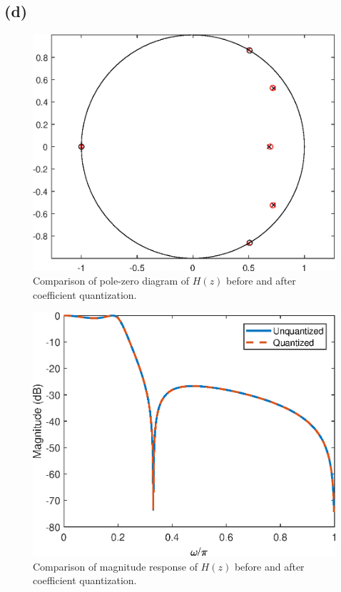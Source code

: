 \documentclass{article}
\begin{document}
\subsection{(d)}

\FloatBarrier
\begin{figure}[h!]
	\centering
	\includegraphics[scale=0.7]{figs/hw04q6_zplane_quant.eps}
	\caption{Comparison of pole-zero diagram of $H(z)$ before and after coefficient quantization.}
\end{figure}
\FloatBarrier

\FloatBarrier
\begin{figure}[h!]
	\centering
	\includegraphics[scale=0.7]{figs/hw04q6_mag.eps}
	\caption{Comparison of magnitude response of $H(z)$ before and after coefficient quantization.}
\end{figure}
\FloatBarrier
\end{document}
